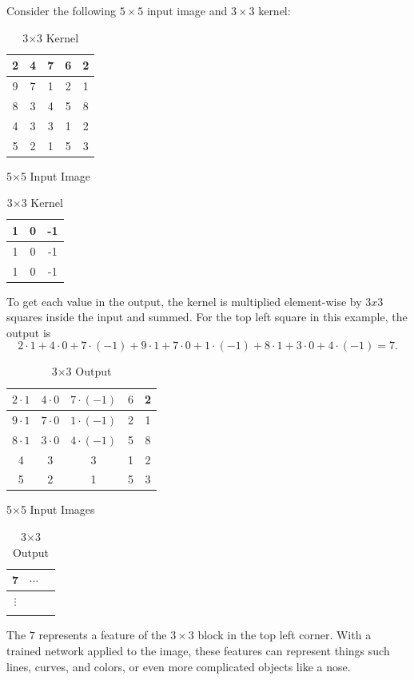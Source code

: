 Consider the following $5\times 5$ input image and $3\times 3$ kernel:
\begin{table}[H]
\parbox{.45\linewidth}{
\centering
\begin{tabular}{|c|c|c|c|c|}
\hline
2 & 4 & 7 & 6 & 2\\
\hline
9 & 7 & 1 & 2 & 1\\
\hline
8 & 3 & 4 & 5 & 8\\
\hline
4 & 3 & 3 & 1 & 2\\
\hline
5 & 2 & 1 & 5 & 3\\
\hline
\end{tabular}
\label{tab:input}
\caption*{5$\times$5 Input Image}
}
\hfill
\parbox{.45\linewidth}{
\centering
\begin{tabular}{|c|c|c|}
\hline
1 & 0 & -1\\
\hline
1 & 0 & -1\\
\hline
1 & 0 & -1\\
\hline
\end{tabular}
\label{tab:input}
\caption*{3$\times$3 Kernel}
}
\end{table}

\noindent
To get each value in the output, the kernel is multiplied element-wise by $3x3$ squares inside the input and summed.
For the top left square in this example, the output is 
\[
2\cdot 1 + 4\cdot 0 + 7\cdot (-1) + 9\cdot 1 + 7\cdot 0 + 1\cdot (-1) + 8\cdot 1 + 3\cdot 0 + 4\cdot (-1) = 7.
\]
\begin{table}[H]
\parbox{.45\linewidth}{
\centering
\begin{tabular}{|c|c|c|c|c|}
\hline
$2\cdot 1$ & $4\cdot 0$ & $7\cdot (-1)$ & $6$ & 2\\
\hline
$9\cdot 1$ & $7\cdot0$ & $1\cdot (-1)$ & 2 & 1\\
\hline
$8\cdot 1$ & $3\cdot0$ & $4\cdot (-1)$ & 5 & 8\\
\hline
4 & 3 & 3 & 1 & 2\\
\hline
5 & 2 & 1 & 5 & 3\\
\hline
\end{tabular}
\label{tab:input}
\caption*{5$\times$5 Input Images}
}
\hfill
\parbox{.45\linewidth}{
\centering
\begin{tabular}{|c|c|c|}
\hline
7 & \(\cdots\) & \\
\hline
\(\vdots\) &  & \\
\hline
 & & \\
\hline
\end{tabular}
\label{tab:input}
\caption*{3$\times $3 Output}
}
\end{table}
\noindent
The $7$ represents a feature of the $3\times 3$ block in the top left corner. 
With a trained network applied to the image, these features can represent things such lines, curves, and colors, or even more complicated objects like a nose.

